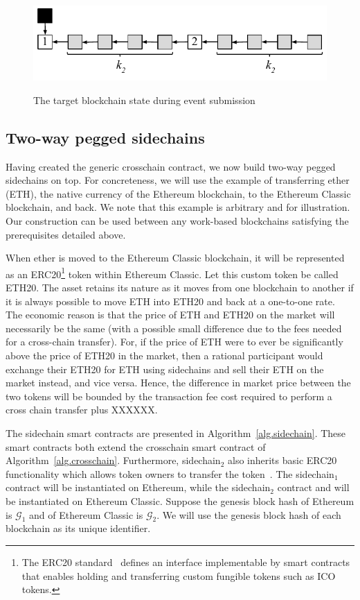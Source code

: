 \begin{figure}
    \caption{The target blockchain state during event submission}
    \centering
    \includegraphics[width=0.6 \columnwidth,keepaspectratio]{figures/contestation.pdf}
    \label{fig.contestation}
\end{figure}

\subsection*{Two-way pegged sidechains}
Having created the generic crosschain contract, we now build two-way pegged
sidechains on top. For concreteness, we will use the example of
transferring ether (ETH), the native currency of the Ethereum blockchain, to the
Ethereum Classic blockchain, and back. We note that this example is arbitrary
and for illustration. Our construction can be used between any work-based
blockchains satisfying the prerequisites detailed above.

When ether is moved to the Ethereum Classic blockchain, it will be represented
as an ERC20\footnote{The ERC20 standard~\cite{erc20} defines an interface
implementable by smart contracts that enables holding and transferring custom
fungible tokens such as ICO tokens.} token within Ethereum Classic. Let this
custom token be called ETH20. The asset retains its nature as it moves from one
blockchain to another if it is always possible to move ETH into ETH20 and back
at a one-to-one rate. The economic reason is that the price of ETH and ETH20 on
the market will necessarily be the same (with a possible small difference due to
the fees needed for a cross-chain transfer). For, if the price of ETH were to
ever be significantly above the price of ETH20 in the market, then a rational
participant would exchange their ETH20 for ETH using sidechains and sell their
ETH on the market instead, and vice versa. Hence, the difference in market price between the two tokens  will be bounded by the  transaction fee cost required to  perform a cross chain transfer plus XXXXXX.

The sidechain smart contracts are presented in Algorithm~\ref{alg.sidechain}.
These smart contracts both extend the \textsf{crosschain} smart contract of
Algorithm~\ref{alg.crosschain}. Furthermore, \textsf{sidechain}$_2$ also
inherits basic \textsf{ERC20} functionality which allows token owners to
transfer the token~\cite{openzeppelin-erc20}. The \textsf{sidechain}$_1$
contract will be instantiated on Ethereum, while the \textsf{sidechain}$_2$
contract and will be instantiated on Ethereum Classic. Suppose the genesis block
hash of Ethereum is $\mathcal{G}_1$ and of Ethereum Classic is $\mathcal{G}_2$.
We will use the genesis block hash of each blockchain as its unique identifier.

